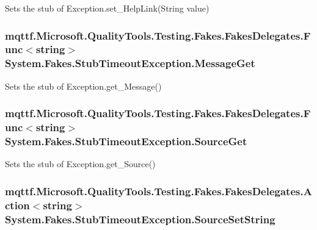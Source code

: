 Sets the stub of Exception.\-set\-\_\-\-Help\-Link(\-String value)

\hypertarget{class_system_1_1_fakes_1_1_stub_timeout_exception_a15b1cec6e1b976ff58814e5b49405799}{
\subsubsection[{Message\-Get}]{\setlength{\rightskip}{0pt plus 5cm}mqttf.\-Microsoft.\-Quality\-Tools.\-Testing.\-Fakes.\-Fakes\-Delegates.\-Func$<$string$>$ System.\-Fakes.\-Stub\-Timeout\-Exception.\-Message\-Get}}\label{class_system_1_1_fakes_1_1_stub_timeout_exception_a15b1cec6e1b976ff58814e5b49405799}


Sets the stub of Exception.\-get\-\_\-\-Message()

\hypertarget{class_system_1_1_fakes_1_1_stub_timeout_exception_a00776c61f711123a44d3566d7fba09a7}{
\subsubsection[{Source\-Get}]{\setlength{\rightskip}{0pt plus 5cm}mqttf.\-Microsoft.\-Quality\-Tools.\-Testing.\-Fakes.\-Fakes\-Delegates.\-Func$<$string$>$ System.\-Fakes.\-Stub\-Timeout\-Exception.\-Source\-Get}}\label{class_system_1_1_fakes_1_1_stub_timeout_exception_a00776c61f711123a44d3566d7fba09a7}


Sets the stub of Exception.\-get\-\_\-\-Source()

\hypertarget{class_system_1_1_fakes_1_1_stub_timeout_exception_a1923dd1059fda5627820899ae384f5f0}{
\subsubsection[{Source\-Set\-String}]{\setlength{\rightskip}{0pt plus 5cm}mqttf.\-Microsoft.\-Quality\-Tools.\-Testing.\-Fakes.\-Fakes\-Delegates.\-Action$<$string$>$ System.\-Fakes.\-Stub\-Timeout\-Exception.\-Source\-Set\-String}}\label{class_system_1_1_fakes_1_1_stub_timeout_exception_a1923dd1059fda5627820899ae384f5f0}


